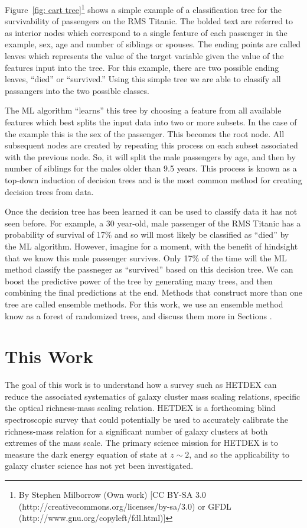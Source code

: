 Figure~\ref{fig: cart tree}\footnote{By Stephen Milborrow (Own work) [CC BY-SA 3.0 (http://creativecommons.org/licenses/by-sa/3.0) or GFDL (http://www.gnu.org/copyleft/fdl.html)]} shows a simple example of a classification tree for the survivability of passengers on the RMS Titanic. The bolded text are referred to as interior nodes which correspond to a single feature of each passenger in the example, sex, age and number of siblings or spouses. The ending points are called leaves which represents the value of the target variable given the value of the features input into the tree. For this example, there are two possible ending leaves, ``died'' or ``survived.'' Using this simple tree we are able to classify all passangers into the two possible classes. 

The ML algorithm ``learns'' this tree by choosing a feature from all available features which best splits the input data into two or more subsets. In the case of the example this is the sex of the passenger. This becomes the root node. All subsequent nodes are created by repeating this process on each subset associated with the previous node. So, it will split the male passengers by age, and then by number of siblings for the males older than 9.5 years. This process is known as a top-down induction of decision trees and is the most common method for creating decision trees from data.

Once the decision tree has been learned it can be used to classify data it has not seen before. For example, a 30 year-old, male passenger of the RMS Titanic has a probability of survival of 17\% and so will most likely be classified as ``died'' by the ML algorithm. However, imagine for a moment, with the benefit of hindsight that we know this male passenger survives. Only 17\% of the time will the ML method classify the passneger as ``survived'' based on this decision tree. We can boost the predictive power of the tree by generating many trees, and then combining the final predictions at the end. Methods that construct more than one tree are called ensemble methods. For this work, we use an ensemble method know as a forest of randomized trees, and discuss them more in Sections .

\section{This Work}
The goal of this work is to understand how a survey such as HETDEX can reduce the associated systematics of galaxy cluster mass scaling relations, specific the optical richness-mass scaling relation. HETDEX is a forthcoming blind spectroscopic survey that could potentially be used to accurately calibrate the richness-mass relation for a significant number of galaxy clusters at both extremes of the mass scale. The primary science mission for HETDEX is to measure the dark energy equation of state at $z\sim2$, and so the applicability to galaxy cluster science has not yet been investigated.

